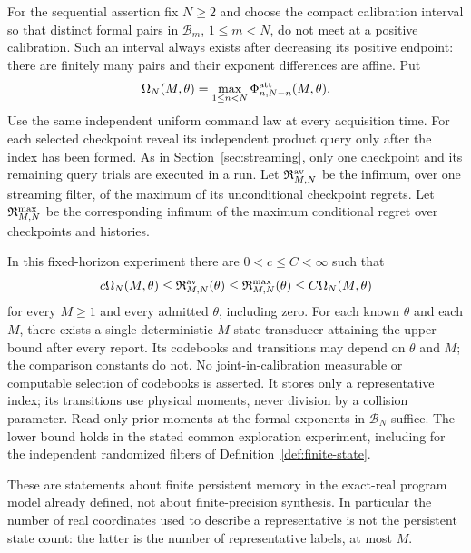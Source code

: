 For the sequential assertion fix $N\ge2$ and choose the compact
calibration interval so that distinct formal pairs in
$\mathcal B_m$, $1\le m<N$, do not meet at a positive calibration.
Such an interval always exists after decreasing its positive endpoint:
there are finitely many pairs and their exponent differences are affine.
Put
\begin{equation}\label{eq:general-stream-profile}
 \Omega_N(M,\theta)
   =\max_{1\le n<N}\Phi^{\rm att}_{n,N-n}(M,\theta).
\end{equation}
Use the same independent uniform command law at every acquisition time.
For each selected checkpoint reveal its independent product query only
after the index has been formed. As in Section~\ref{sec:streaming}, only
one checkpoint and its remaining query trials are executed in a run.
Let $\mathfrak R^{\rm av}_{M,N}$ be the infimum, over one streaming
filter, of the maximum of its unconditional checkpoint regrets. Let
$\mathfrak R^{\rm max}_{M,N}$ be the corresponding infimum of the
maximum conditional regret over checkpoints and histories.

\begin{theorem}\label{thm:general-uniform-streaming}
In this fixed-horizon experiment there are $0<c\le C<\infty$ such that
\begin{equation}\label{eq:general-stream-law}
 c\Omega_N(M,\theta)\le\mathfrak R^{\rm av}_{M,N}(\theta)
 \le\mathfrak R^{\rm max}_{M,N}(\theta)
 \le C\Omega_N(M,\theta)
\end{equation}
for every $M\ge1$ and every admitted $\theta$, including zero. For each known $\theta$ and each $M$, there exists a
single deterministic $M$-state transducer attaining the upper bound after
every report. Its codebooks and transitions may depend on $\theta$ and
$M$; the comparison constants do not. No joint-in-calibration measurable
or computable selection of codebooks is asserted. It stores only a representative index; its transitions use
physical moments, never division by a collision parameter. Read-only
prior moments at the formal exponents in $\mathcal B_N$ suffice.
The lower bound holds in the stated common exploration experiment,
including for the independent randomized filters of
Definition~\ref{def:finite-state}.
\end{theorem}

These are statements about finite persistent memory in the exact-real
program model already defined, not about finite-precision synthesis.
In particular the number of real coordinates used to describe a
representative is not the persistent state count: the latter is the
number of representative labels, at most $M$.

